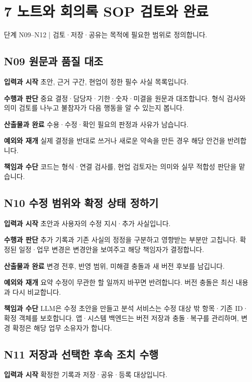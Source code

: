 \documentclass[a4paper,10pt]{article}
\begin{document}
\endgroup
\clearpage
\section*{7 노트와 회의록 SOP 검토와 완료}
단계 N09–N12  |  검토·저장·공유는 목적에 필요한 범위로 정의합니다.


\begingroup\setlength{\parskip}{3pt}
\subsection*{N09 원문과 품질 대조}
\noindent\textbf{입력과 시작} 초안, 근거 구간, 현업이 정한 필수 사실 목록입니다.


\noindent\textbf{수행과 판단} 중요 결정·담당자·기한·숫자·미결을 원문과 대조합니다. 형식 검사와 의미 검토를 나누고 불참자가 다음 행동을 알 수 있는지 봅니다.


\noindent\textbf{산출물과 완료} 수용·수정·확인 필요의 판정과 사유가 남습니다.


\noindent\textbf{예외와 재개} 실제 결정을 반대로 쓰거나 새로운 약속을 만든 경우 해당 안건을 반려합니다.


\noindent\textbf{책임과 수단} 코드는 형식·연결 검사를, 현업 검토자는 의미와 실무 적합성 판단을 맡습니다.


\endgroup
\begingroup\setlength{\parskip}{3pt}
\subsection*{N10 수정 범위와 확정 상태 정하기}
\noindent\textbf{입력과 시작} 초안과 사용자의 수정 지시·추가 사실입니다.


\noindent\textbf{수행과 판단} 추가 기록과 기존 사실의 정정을 구분하고 영향받는 부분만 고칩니다. 확정된 일정·업무 변경은 변경안을 보여주고 해당 책임자가 결정합니다.


\noindent\textbf{산출물과 완료} 변경 전후, 반영 범위, 미해결 충돌과 새 버전 후보를 남깁니다.


\noindent\textbf{예외와 재개} 요약 수정이 무관한 할 일까지 바꾸면 반려합니다. 버전 충돌은 최신 내용과 다시 비교합니다.


\noindent\textbf{책임과 수단} LLM은 수정 초안을 만들고 분석 서비스는 수정 대상 밖 항목·기존 ID·확정 객체를 보호합니다. 앱·시스템 백엔드는 버전 저장과 충돌·복구를 관리하며, 변경 확정은 해당 업무 소유자가 합니다.


\endgroup
\begingroup\setlength{\parskip}{3pt}
\subsection*{N11 저장과 선택한 후속 조치 수행}
\noindent\textbf{입력과 시작} 확정한 기록과 저장·공유·등록 대상입니다.
\end{document}
